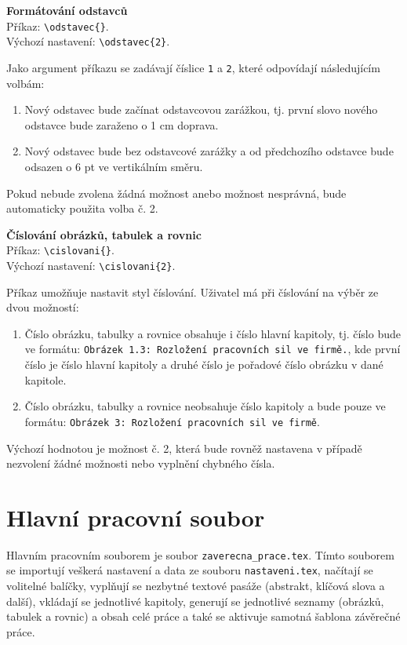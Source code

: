 \vspace{8pt}
\textbf{Formátování odstavců}\\
Příkaz: \verb|\odstavec{}|.\\
Výchozí nastavení: \verb|\odstavec{2}|.

Jako argument příkazu se zadávají číslice \verb|1| a \verb|2|, které odpovídají následujícím volbám:

\begin{enumerate}
	\item Nový odstavec bude začínat odstavcovou zarážkou, tj. první slovo nového odstavce bude zaraženo o 1 cm doprava.
	\item Nový odstavec bude bez odstavcové zarážky a od předchozího odstavce bude odsazen o 6 pt ve vertikálním směru.
\end{enumerate}

Pokud nebude zvolena žádná možnost anebo možnost nesprávná, bude automaticky použita volba č. 2.

\vspace{8pt}
\textbf{Číslování obrázků, tabulek a rovnic}\\
Příkaz: \verb|\cislovani{}|.\\
Výchozí nastavení: \verb|\cislovani{2}|.

Příkaz umožňuje nastavit styl číslování. Uživatel má při číslování na výběr ze dvou možností:

\begin{enumerate}
	\item Číslo obrázku, tabulky a rovnice obsahuje i číslo hlavní kapitoly, tj. číslo bude ve formátu: \verb|Obrázek 1.3: Rozložení pracovních sil ve firmě.|, kde první číslo je číslo hlavní kapitoly a druhé číslo je pořadové číslo obrázku v dané kapitole.
	\item Číslo obrázku, tabulky a rovnice neobsahuje číslo kapitoly a bude pouze ve formátu: \verb|Obrázek 3: Rozložení pracovních sil ve firmě|.
\end{enumerate}

Výchozí hodnotou je možnost č. 2, která bude rovněž nastavena v případě nezvolení žádné možnosti nebo vyplnění chybného čísla.



\section{Hlavní pracovní soubor}
Hlavním pracovním souborem je soubor \verb|zaverecna_prace.tex|. Tímto souborem se importují veškerá nastavení a data ze souboru \verb|nastaveni.tex|, načítají se volitelné balíčky, vyplňují se nezbytné textové pasáže (abstrakt, klíčová slova a další), vkládají se jednotlivé kapitoly, generují se jednotlivé seznamy (obrázků, tabulek a rovnic) a obsah celé práce a také se aktivuje samotná šablona závěrečné práce.

